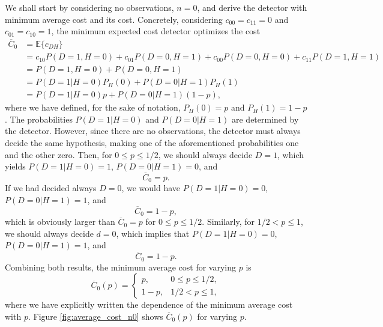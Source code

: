 We shall start by considering no observations, $n = 0$, and derive the detector with minimum average cost and its cost. Concretely, considering $c_{00} = c_{11} = 0$ and $c_{01} = c_{10} = 1$, the minimum expected cost detector optimizes the cost
\begin{align*}
	\overline{C}_0 &= \mathbb{E}\{c_{DH}\} \\ &= c_{10} P(D = 1, H = 0) +  c_{01} P(D = 0, H = 1)  + c_{00} P(D = 0, H = 0) +  c_{11} P(D = 1, H = 1)  \\
	&= P(D = 1, H = 0) +  P(D = 0, H = 1) \\ &= P(D = 1 | H = 0) P_H(0) +  P(D = 0 |H = 1) P_H(1)
	\\ &= P(D = 1 | H = 0) p +  P(D = 0 |H = 1) (1 - p),
\end{align*}
where we have defined, for the sake of notation, $P_H(0) = p$ and $P_H(1) = 1 - p$. The probabilities $P(D = 1 | H = 0)$ and $P(D = 0 | H = 1)$ are determined by the detector. However, since there are no observations, the detector must always decide the same hypothesis, making one of the aforementioned probabilities one and the other zero. Then, for $0 \leq p \leq 1/2$, we should always decide $D = 1$, which yields $P(D = 1 | H = 0) = 1$, $P(D = 0 | H = 1) = 0$, and
\begin{equation*}
	\overline{C}_0 = p.
\end{equation*}
If we had decided always $D = 0$, we would have $P(D = 1 | H = 0) = 0$, $P(D = 0 | H = 1) = 1$, and
\begin{equation*}
	\overline{C}_0 = 1 - p,
\end{equation*}
which is obviously larger than $\overline{C}_0 = p$ for $0 \leq p \leq 1/2$. Similarly, for $1/2 < p \leq 1$, we should always decide $d = 0$, which implies that $P(D = 1 | H = 0) = 0$, $P(D = 0 | H = 1) = 1$, and
\begin{equation*}
	\overline{C}_0 = 1 - p.
\end{equation*}
Combining both results, the minimum average cost for varying $p$ is
\begin{equation*}
	\overline{C}_0(p) = \begin{cases} p, & 0 \leq p \leq 1/2, \\ 1 - p, & 1/2 < p \leq 1, \end{cases}
\end{equation*}
where we have explicitly written the dependence of the minimum average cost  with $p$. Figure \ref{fig:average_cost_n0} shows $\overline{C}_0(p)$ for varying $p$.


